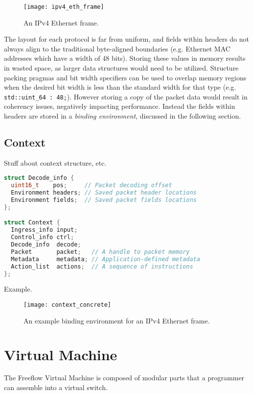 \begin{figure}[h]
\centering
\texttt{[image: ipv4\_eth\_frame]}
\caption{An IPv4 Ethernet frame.}
\label{fig:ipv4_eth_frame}
\end{figure}

The layout for each protocol is far from uniform, and fields within headers do not always align to the traditional byte-aligned boundaries (e.g. Ethernet MAC addresses which have a width of 48 bits). Storing these values in memory results in wasted space, as larger data structures would need to be utilized. Structure packing pragmas and bit width specifiers can be used to overlap memory regions when the desired bit width is less than the standard width for that type (e.g. \lstinline{std::uint_64 : 48;}). However storing a copy of the packet data would result in coherency issues, negatively impacting performance. Instead the fields within headers are stored in a \emph{binding environment}, discussed in the following section.

\subsection{Context}
Stuff about context structure, etc.

\lstset{basicstyle=\tiny}
\begin{lstlisting}[language=c++]
struct Decode_info {
  uint16_t    pos;     // Packet decoding offset
  Environment headers; // Saved packet header locations
  Environment fields;  // Saved packet fields locations
};

struct Context {
  Ingress_info input;
  Control_info ctrl;
  Decode_info  decode;
  Packet       packet;   // A handle to packet memory
  Metadata     metadata; // Application-defined metadata
  Action_list  actions;  // A sequence of instructions
};
\end{lstlisting}

Example.

\begin{figure}[h]
\centering
\texttt{[image: context\_concrete]}
\caption{An example binding environment for an IPv4 Ethernet frame.}
\label{fig:context_binding}
\end{figure}

\section{Virtual Machine}
\label{vm}
The Freeflow Virtual Machine is composed of modular parts that a programmer can
assemble into a virtual switch.

